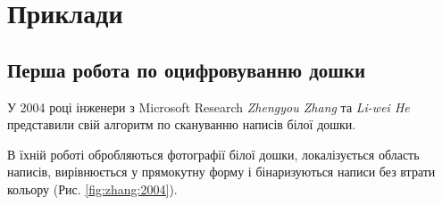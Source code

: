 \section{Приклади}

\vspace{-\baselineskip}

\subsection{Перша робота по оцифровуванню дошки}

У 2004 році інженери з Microsoft Research \textit{Zhengyou Zhang}
та \textit{Li-wei He} представили свій алгоритм по скануванню написів
білої дошки.

В їхній роботі \cite{zhang:2004} обробляються фотографії білої дошки, локалізується область
написів, вирівнюється у прямокутну форму і бінаризуються написи без втрати
кольору (Рис. \ref{fig:zhang:2004}).
